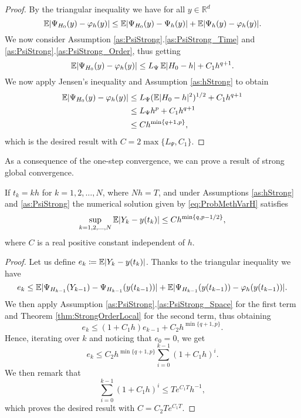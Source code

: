 \documentclass{siamart1116}
\numberwithin{theorem}{section}
\DeclarePairedDelimiter{\abs}{\lvert}{\rvert}
\renewcommand{\phi}{\varphi}
\newcommand{\R}{\mathbb{R}}
\newcommand{\defeq}{\coloneqq}
\newcommand{\E}{\operatorname{\mathbb{E}}}
\newcommand{\sksum}{\textstyle\sum}
\begin{document}
\begin{proof} By the triangular inequality we have for all $y \in \R^d$ 
	\begin{equation}
		\E\abs{\Psi_{H_0}(y) - \phi_h(y)} \leq \E\abs{\Psi_{H_0}(y) - \Psi_h(y)} + \E\abs{\Psi_h(y) - \phi_h(y)}.
	\end{equation}		
	We now consider Assumption \ref{as:PsiStrong}.\ref{as:PsiStrong_Time} and \ref{as:PsiStrong}.\ref{as:PsiStrong_Order}, thus getting
	\begin{equation}
		\E\abs{\Psi_{H_0}(y) - \phi_h(y)} \leq L_{\Psi} \E\abs{H_0 - h} + C_1 h^{q+1}.
	\end{equation}
	We now apply Jensen's inequality and Assumption \ref{as:hStrong} to obtain
	\begin{equation}
	\begin{aligned}
		\E\abs{\Psi_{H_0}(y) - \phi_h(y)} & \leq L_{\Psi} (\E\abs{H_0 - h}^{2})^{1/2} + C_1 h^{q+1}\\
		&\leq L_{\Psi} h^p + C_1 h^{q+1} \\
		&\leq C h^{\min\{q+1, p\}},
	\end{aligned}
	\end{equation}
	which is the desired result with $C = 2\max\{L_\Psi, C_1\}$.
\end{proof}
As a consequence of the one-step convergence, we can prove a result of strong global convergence.
\begin{theorem}\label{thm:StrongOrder} If $t_k = kh$ for $k = 1, 2, \ldots, N$, where $Nh = T$, and under Assumptions \ref{as:hStrong} and \ref{as:PsiStrong} the numerical solution given by \eqref{eq:ProbMethVarH} satisfies 
	\begin{equation}\label{eq:StrongGlobalClaim}
		\sup_{k=1,2, \ldots, N} \E\abs{Y_k - y(t_k)} \leq C h^{\min\{q, p-1/2\}},
	\end{equation}
	where $C$ is a real positive constant independent of $h$. 
\end{theorem}
\begin{proof} Let us define $e_k \defeq \E\abs{Y_k - y(t_k)}$. Thanks to the triangular inequality we have
	\begin{equation}
		e_k \leq \E\abs{\Psi_{H_{k-1}}(Y_{k-1}) - \Psi_{H_{k-1}}(y(t_{k-1}))} + \E\abs{\Psi_{H_{k-1}}(y(t_{k-1})) - \phi_{h}(y(t_{k-1}))}.
	\end{equation}
	 We then apply Assumption \ref{as:PsiStrong}.\ref{as:PsiStrong_Space} for the first term and Theorem \ref{thm:StrongOrderLocal} for the second term, thus obtaining
	\begin{equation}
		e_k \leq (1 + C_1h) e_{k - 1} + C_2 h^{\min\{q + 1, p\}}.
	\end{equation}
	Hence, iterating over $k$ and noticing that $e_0 = 0$, we get
	\begin{equation}
		e_k \leq C_2 h^{\min\{q + 1, p\}} \sksum_{i=0}^{k-1} (1 + C_1h)^i.
	\end{equation}
	We then remark that
	\begin{equation}
		\sksum_{i=0}^{k-1} (1 + C_1h)^i \leq Te^{C_1T}h^{-1},
	\end{equation}
	which proves the desired result with $C = C_2 Te^{C_1T}$.
\end{proof}
\end{document}
